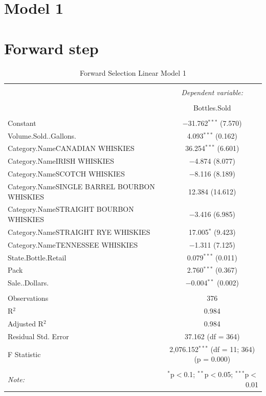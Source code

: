 \documentclass[]{elsarticle} %
\begin{document}
\section{Model 1}\label{model-1}

\section{Forward step}\label{forward-step}

\begin{table}[!htbp] \centering 
  \caption{Forward Selection Linear Model 1} 
  \label{} 
\normalsize 
\begin{tabular}{@{\extracolsep{5pt}}lc} 
\\[-1.8ex]\hline 
\hline \\[-1.8ex] 
 & \multicolumn{1}{c}{\textit{Dependent variable:}} \\ 
\cline{2-2} 
\\[-1.8ex] & Bottles.Sold \\ 
\hline \\[-1.8ex] 
 Constant & $-$31.762$^{***}$ (7.570) \\ 
  Volume.Sold..Gallons. & 4.093$^{***}$ (0.162) \\ 
  Category.NameCANADIAN WHISKIES & 36.254$^{***}$ (6.601) \\ 
  Category.NameIRISH WHISKIES & $-$4.874 (8.077) \\ 
  Category.NameSCOTCH WHISKIES & $-$8.116 (8.189) \\ 
  Category.NameSINGLE BARREL BOURBON WHISKIES & 12.384 (14.612) \\ 
  Category.NameSTRAIGHT BOURBON WHISKIES & $-$3.416 (6.985) \\ 
  Category.NameSTRAIGHT RYE WHISKIES & 17.005$^{*}$ (9.423) \\ 
  Category.NameTENNESSEE WHISKIES & $-$1.311 (7.125) \\ 
  State.Bottle.Retail & 0.079$^{***}$ (0.011) \\ 
  Pack & 2.760$^{***}$ (0.367) \\ 
  Sale..Dollars. & $-$0.004$^{**}$ (0.002) \\ 
 \hline \\[-1.8ex] 
Observations & 376 \\ 
R$^{2}$ & 0.984 \\ 
Adjusted R$^{2}$ & 0.984 \\ 
Residual Std. Error & 37.162 (df = 364) \\ 
F Statistic & 2,076.152$^{***}$ (df = 11; 364)  (p = 0.000) \\ 
\hline 
\hline \\[-1.8ex] 
\textit{Note:}  & \multicolumn{1}{r}{$^{*}$p$<$0.1; $^{**}$p$<$0.05; $^{***}$p$<$0.01} \\ 
\end{tabular} 
\end{table}
\end{document}
